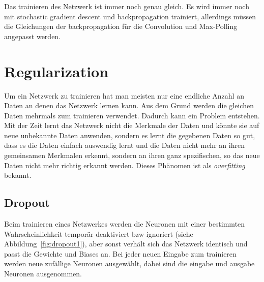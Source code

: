 \documentclass[12pt,a4paper]{report}
\begin{document}
Das trainieren des Netzwerk ist immer noch genau gleich.
Es wird immer noch mit stochastic gradient descent und backpropagation trainiert,
allerdings müssen die Gleichungen der backpropagation für die Convolution und Max-Polling angepasst werden.

\section{Regularization}
Um ein Netzwerk zu trainieren hat man meisten nur eine endliche Anzahl an Daten an denen das Netzwerk lernen kann.
Aus dem Grund werden die gleichen Daten mehrmals zum trainieren verwendet.
Dadurch kann ein Problem entstehen.
Mit der Zeit lernt das Netzwerk nicht die Merkmale der Daten und könnte sie auf neue unbekannte Daten anwenden,
sondern es lernt die gegebenen Daten so gut, dass es die Daten einfach auswendig lernt und die Daten nicht mehr an ihren gemeinsamen Merkmalen erkennt,
sondern an ihren ganz spezifischen, so das neue Daten nicht mehr richtig erkannt werden.
Dieses Phänomen ist als \textit{overfitting} bekannt.
\subsection{Dropout}
Beim trainieren eines Netzwerkes werden die Neuronen mit einer bestimmten Wahrscheinlichkeit temporär deaktiviert bzw ignoriert (siehe Abbildung~\ref{fig:dropout1}),
aber sonst verhält sich das Netzwerk identisch und passt die Gewichte und Biases an.
Bei jeder neuen Eingabe zum trainieren werden neue zufällige Neuronen ausgewählt,
dabei sind die eingabe und ausgabe Neuronen ausgenommen.
\end{document}
